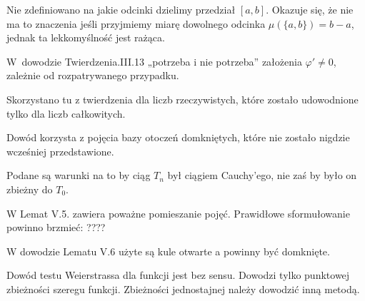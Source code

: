 \documentclass[a4paper,11pt]{article}
\numberwithin{equation}{section}
\begin{document}
\VerSpaceFour





\noindent
{} Nie zdefiniowano na jakie odcinki dzielimy przedział $[ a, b ]$.
Okazuje się, że nie ma to znaczenia jeśli przyjmiemy miarę dowolnego
odcinka $\mu ( \{ a, b \} ) = b - a$, jednak ta lekkomyślność jest rażąca.

\VerSpaceFour





\noindent
{} W~dowodzie Twierdzenia.III.13 „potrzeba i nie potrzeba” założenia
$\varphi' \neq 0$, zależnie od rozpatrywanego przypadku.

\VerSpaceFour





\noindent
{} Skorzystano tu z twierdzenia dla liczb rzeczywistych, które
zostało udowodnione tylko dla liczb całkowitych.

\VerSpaceFour





\noindent
{} Dowód korzysta z pojęcia bazy otoczeń domkniętych, które nie
zostało nigdzie wcześniej przedstawione.

\VerSpaceFour





\noindent
{} Podane są warunki na to by ciąg $T_{ n }$ był ciągiem Cauchy’ego,
nie zaś by było on zbieżny do $T_{ 0 }$.

\VerSpaceFour





\noindent
{} W Lemat V.5. zawiera poważne pomieszanie pojęć. Prawidłowe
sformułowanie powinno brzmieć: ????

\VerSpaceFour





\noindent
{} W dowodzie Lematu V.6 użyte są kule otwarte a powinny być
domknięte.

\VerSpaceFour





\noindent
{} Dowód testu Weierstrassa dla funkcji jest bez sensu. Dowodzi tylko
punktowej zbieżności szeregu funkcji. Zbieżności jednostajnej należy
dowodzić inną metodą.

\VerSpaceFour
\end{document}
